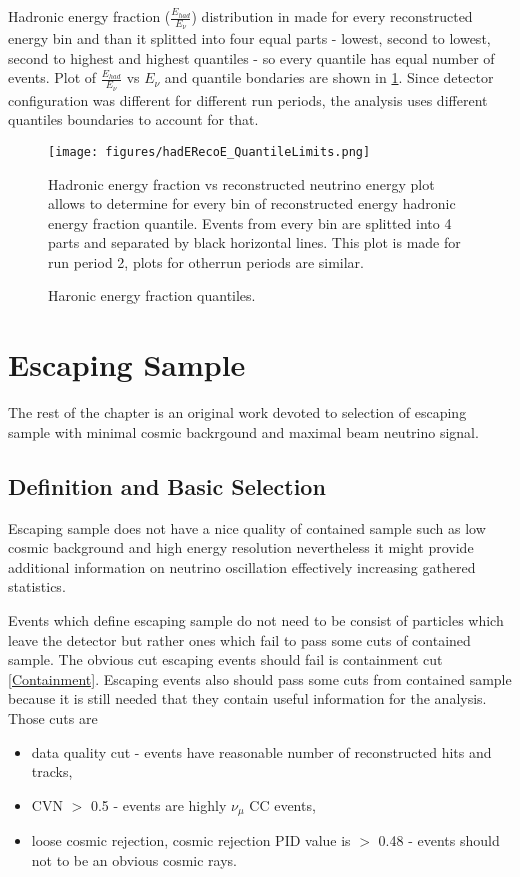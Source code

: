 Hadronic energy fraction ($\frac{E_{had}}{E_\nu}$) distribution in made for every reconstructed energy
bin and than it splitted into four equal parts - lowest, second to lowest, second to highest and highest
quantiles - so every quantile has equal number of events. Plot of $\frac{E_{had}}{E_\nu}$ vs $E_\nu$ and 
quantile bondaries are shown in \ref{fig:hadE_Quant}. Since detector configuration was different for 
different run periods, the analysis uses different quantiles boundaries to account for that. 
\begin{figure}[h]
\centering
\texttt{[image: figures/hadERecoE\_QuantileLimits.png]}
\caption{Haronic energy fraction quantiles.}
{Hadronic energy fraction vs reconstructed neutrino energy plot allows to determine for every bin of
reconstructed energy hadronic energy fraction quantile. Events from every bin are splitted into 4 parts
and separated by black horizontal lines. This plot is made for run period 2, plots for otherrun periods 
are similar.}
\label{fig:hadE_Quant}
\end{figure}

\section{Escaping Sample}
The rest of the chapter is an original work devoted to selection of escaping sample with minimal
cosmic backrgound and maximal beam neutrino signal.

\subsection{Definition and Basic Selection} \label{base_cut}
Escaping sample does not have a nice quality of contained sample such as low cosmic background and
high energy resolution nevertheless it might provide additional information on neutrino oscillation
effectively increasing gathered statistics. 

Events which define escaping sample do not need to be consist of particles which leave the detector but
rather ones which fail to pass some cuts of contained sample. The obvious cut escaping events should 
fail is containment cut \ref{Containment}. Escaping events also should pass some cuts from contained 
sample because it is still needed that they contain useful information for the analysis. Those cuts are
\begin{itemize}
\item data quality cut - events have reasonable number of reconstructed hits and tracks,
\item CVN $>$ 0.5 - events are highly $\nu_\mu$ CC events,
\item loose cosmic rejection, cosmic rejection PID value is $>$ 0.48 - events should not to be an obvious 
cosmic rays.
\end{itemize}

